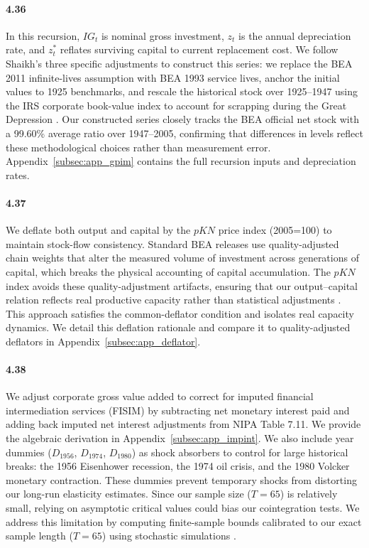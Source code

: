\paragraph{4.36}
In this recursion, $IG_t$ is nominal gross investment, $z_t$ is the annual depreciation rate, and $z_t^*$ reflates surviving capital to current replacement cost. We follow Shaikh's three specific adjustments to construct this series: we replace the BEA 2011 infinite-lives assumption with BEA 1993 service lives, anchor the initial values to 1925 benchmarks, and rescale the historical stock over 1925--1947 using the IRS corporate book-value index to account for scrapping during the Great Depression \citep[Appendix~6.7]{Shaikh2016}. Our constructed series closely tracks the BEA official net stock with a 99.60\% average ratio over 1947--2005, confirming that differences in levels reflect these methodological choices rather than measurement error. Appendix~\ref{subsec:app_gpim} contains the full recursion inputs and depreciation rates.

\paragraph{4.37}
We deflate both output and capital by the $pKN$ price index (2005=100) to maintain stock-flow consistency. Standard BEA releases use quality-adjusted chain weights that alter the measured volume of investment across generations of capital, which breaks the physical accounting of capital accumulation. The $pKN$ index avoids these quality-adjustment artifacts, ensuring that our output--capital relation reflects real productive capacity rather than statistical adjustments \citep[Appendix~6.6]{Shaikh2016}. This approach satisfies the common-deflator condition and isolates real capacity dynamics. We detail this deflation rationale and compare it to quality-adjusted deflators in Appendix~\ref{subsec:app_deflator}.

\paragraph{4.38}
We adjust corporate gross value added to correct for imputed financial intermediation services (FISIM) by subtracting net monetary interest paid and adding back imputed net interest adjustments from NIPA Table 7.11. We provide the algebraic derivation in Appendix~\ref{subsec:app_impint}. We also include year dummies ($D_{1956}$, $D_{1974}$, $D_{1980}$) as shock absorbers to control for large historical breaks: the 1956 Eisenhower recession, the 1974 oil crisis, and the 1980 Volcker monetary contraction. These dummies prevent temporary shocks from distorting our long-run elasticity estimates. Since our sample size ($T = 65$) is relatively small, relying on asymptotic critical values could bias our cointegration tests. We address this limitation by computing finite-sample bounds calibrated to our exact sample length ($T=65$) using stochastic simulations \citep{NatsiopoulosTzeremes2022}.

